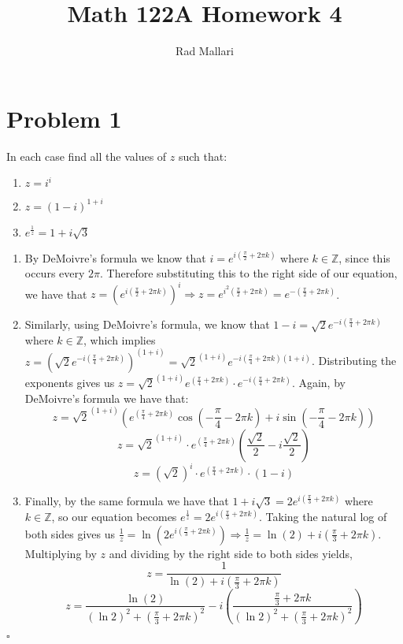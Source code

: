 \documentclass[12pt]{article}
\title{Math 122A Homework 4}
\author{Rad Mallari}
\newcommand{\Z}{\mathbb{Z}}
\newenvironment{proof}{\noindent{\bf Proof.}}{\hfill $\square$\medskip}
\begin{document}
\maketitle

\section{Problem 1}
In each case find all the values of $z$ such that:
\begin{enumerate}[label=\textbf{(\alph*)}]
    \item $z=i^{i}$
    \item $z=(1-i)^{1+i}$
    \item $e^{\frac{1}{z}}=1+i\sqrt{3}$
\end{enumerate}

\begin{proof}
\begin{enumerate}[label=\textbf{(\alph*)}]
    \item By DeMoivre's formula we know that $i=e^{i(\frac{\pi}{2}+2\pi k)}$ where $k\in\Z$, since this occurs every $2\pi$. Therefore substituting this to the right side of our equation, we have that $z=(e^{i(\frac{\pi}{2}+2\pi k)})^{i}\Rightarrow z=e^{i^{2}(\frac{\pi}{2}+2\pi k)}=e^{-(\frac{\pi}{2}+2\pi k)}$.
    \item Similarly, using DeMoivre's formula, we know that $1-i=\sqrt{2}e^{-i(\frac{\pi}{4}+2\pi k)}$ where $k\in\Z$, which implies $z=(\sqrt{2}e^{-i(\frac{\pi}{4}+2\pi k)})^{(1+i)}=\sqrt{2}^{(1+i)}e^{-i(\frac{\pi}{4}+2\pi k)(1+i)}$.
    Distributing the exponents gives us $z=\sqrt{2}^{(1+i)}e^{(\frac{\pi}{4}+2\pi k)}\cdot e^{-i(\frac{\pi}{4}+2\pi k)}$. Again, by DeMoivre's formula we have that:
    $$z=\sqrt{2}^{(1+i)}\left(e^{(\frac{\pi}{4}+2\pi k)}\cos(-\frac{\pi}{4}-2\pi k)+i\sin(-\frac{\pi}{4}-2\pi k)\right)$$
    $$z=\sqrt{2}^{(1+i)}\cdot e^{(\frac{\pi}{4}+2\pi k)}\left(\frac{\sqrt{2}}{2}-i\frac{\sqrt{2}}{2}\right)$$
    $$z=(\sqrt{2})^{i}\cdot e^{(\frac{\pi}{4}+2\pi k)}\cdot(1-i)$$

    \item Finally, by the same formula we have that $1+i\sqrt{3}=2e^{i(\frac{\pi}{3}+2\pi k)}$ where $k\in\Z$, so our equation becomes $e^{\frac{1}{z}}=2e^{i(\frac{\pi}{3}+2\pi k)}$. Taking the natural log of both sides gives us $\frac{1}{z}=\ln(2e^{i(\frac{\pi}{3}+2\pi k)})\Rightarrow\frac{1}{z}=\ln(2)+i(\frac{\pi}{3}+2\pi k)$. Multiplying by $z$ and dividing by the right side to both sides yields, $$z=\frac{1}{\ln( 2)+i(\frac{\pi}{3}+2\pi k)}$$
    $$z=\frac{\ln (2)}{(\ln 2)^{2}+(\frac{\pi}{3}+2\pi k)^{2}}-i\left(\frac{\frac{\pi}{3}+2\pi k}{(\ln2)^{2}+(\frac{\pi}{3}+2\pi k)^{2}}\right)$$
\end{enumerate}
\end{proof}
\end{document}
